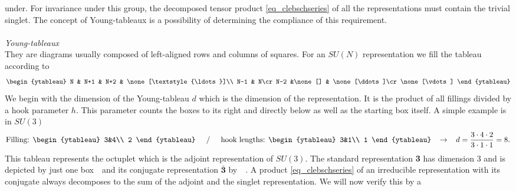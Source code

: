 under. For invariance under this group, the decomposed tensor product \eqref{eq_clebschseries} of all the representations must contain the trivial
singlet. The concept of Young-tableaux is a possibility of determining the compliance of this requirement. 
\\ \\ \textit{Young-tableaux}\\
\noindent They are diagrams usually composed of left-aligned rows and columns of squares. For an $SU(N)$ representation we fill the tableau according
to
\begingroup\makeatletter\def\f@size{5}\check@mathfonts\def\maketag@@@#1{\hbox{\m@th\large\normalfont#1}}
\begin{align*}
\begin{ytableau}
N & N+1 & N+2 & \none[\textstyle{\ldots}]\\
N-1 & N\cr
N-2 &\none[] & \none[\ddots]\cr
\none[\vdots]
\end{ytableau}
\end{align*}\endgroup
We begin with the dimension of the Young-tableau $d$ which is the dimension of the representation. It is the product of all fillings 
divided by a hook parameter $h$. This parameter counts the boxes to its right and directly below as well as the starting
box itself. A simple example is in $SU(3)$
\begin{align*}
\text{Filling: }\begin{ytableau}
 3&4\\
 2
\end{ytableau}\hspace{0.5cm}/\hspace{0.5cm} \text{hook lengths: }\begin{ytableau}
 3&1\\
 1
\end{ytableau}\hspace{0.3cm}\rightarrow\hspace{0.3cm} d = \frac{3\cdot4\cdot2}{3\cdot 1\cdot 1} = 8.
\end{align*}
This tableau represents the octuplet which is the adjoint representation of $SU(3)$. The standard representation \textbf{3} has dimension 3 and is 
depicted by just one box \,\, and its conjugate representation $\bar{\textbf{3}}$ by \, \,. A product 
\eqref{eq_clebschseries} of an irreducible
representation with its conjugate always decomposes to the sum of the adjoint and the singlet representation. We will now verify this by a 

